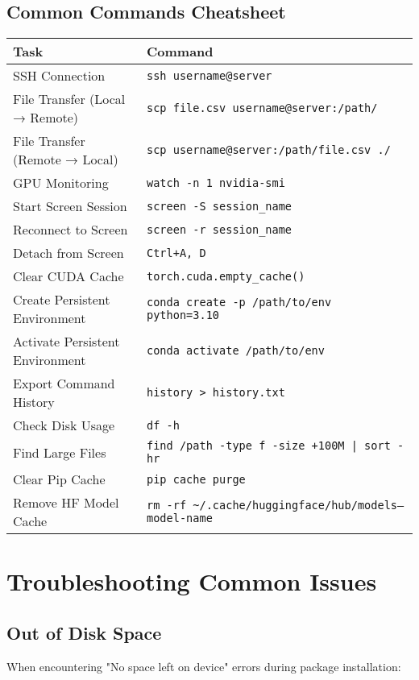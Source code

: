 \documentclass{article}
\begin{document}
\subsection{Common Commands Cheatsheet}

\begin{tabular}{p{6cm}p{8cm}}
\toprule
\textbf{Task} & \textbf{Command} \\
\midrule
SSH Connection & \texttt{ssh username@server} \\
File Transfer (Local → Remote) & \texttt{scp file.csv username@server:/path/} \\
File Transfer (Remote → Local) & \texttt{scp username@server:/path/file.csv ./} \\
GPU Monitoring & \texttt{watch -n 1 nvidia-smi} \\
Start Screen Session & \texttt{screen -S session\_name} \\
Reconnect to Screen & \texttt{screen -r session\_name} \\
Detach from Screen & \texttt{Ctrl+A, D} \\
Clear CUDA Cache & \texttt{torch.cuda.empty\_cache()} \\
Create Persistent Environment & \texttt{conda create -p /path/to/env python=3.10} \\
Activate Persistent Environment & \texttt{conda activate /path/to/env} \\
Export Command History & \texttt{history > history.txt} \\
Check Disk Usage & \texttt{df -h} \\
Find Large Files & \texttt{find /path -type f -size +100M | sort -hr} \\
Clear Pip Cache & \texttt{pip cache purge} \\
Remove HF Model Cache & \texttt{rm -rf \textasciitilde/.cache/huggingface/hub/models--model-name} \\
\bottomrule
\end{tabular}

\section{Troubleshooting Common Issues}

\subsection{Out of Disk Space}
When encountering "No space left on device" errors during package installation:
\end{document}
